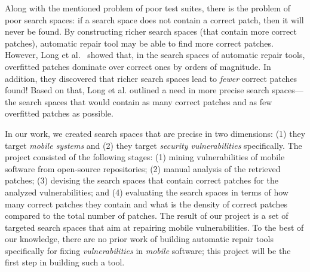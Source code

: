 Along with the mentioned problem of poor test suites, there is the problem of poor search spaces: if a search space does not contain a correct patch, then it will never be found.
By constructing richer search spaces (that contain more correct patches), automatic repair tool may be able to find more correct patches.
However, Long et al.~\cite{long2016analysis} showed that, in the search spaces of \GV automatic repair tools, overfitted patches dominate over correct ones by orders of magnitude.
In addition, they discovered that richer search spaces lead to \emph{fewer} correct patches found!
Based on that, Long et al. outlined a need in more precise search spaces---the search spaces that would contain as many correct patches and as few overfitted patches as possible.

In our work, we created search spaces that are precise in two dimensions: (1) they target \emph{mobile systems} and (2) they target \emph{security vulnerabilities} specifically.
The project consisted of the following stages:
(1) mining vulnerabilities of mobile software from open-source repositories;
(2) manual analysis of the retrieved patches;
(3) devising the search spaces that contain correct patches for the analyzed vulnerabilities; and 
(4) evaluating the search spaces in terms of how many correct patches they contain and what is the density of correct patches compared to the total number of patches.
The result of our project is a set of targeted search spaces that aim at repairing mobile vulnerabilities.
To the best of our knowledge, there are no prior work of building \GV automatic repair tools specifically for fixing \emph{vulnerabilities} in \emph{mobile} software; this project will be the first step in building such a tool.
